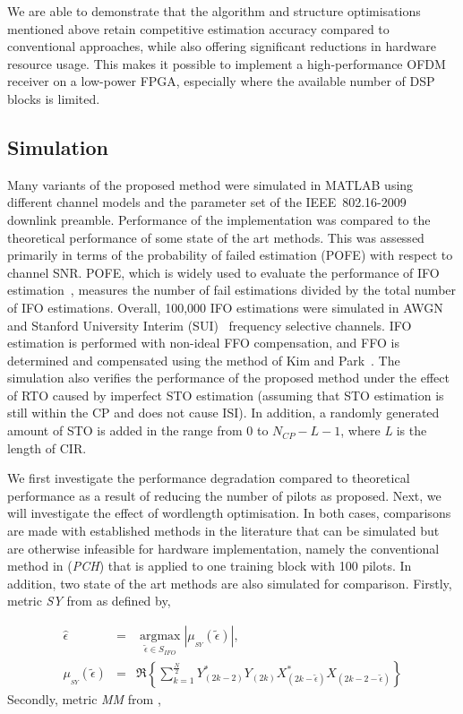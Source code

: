 We are able to demonstrate that the algorithm and structure optimisations mentioned above retain competitive estimation accuracy compared to conventional approaches, while also offering significant reductions in hardware resource usage.
This makes it possible to implement a high-performance OFDM receiver on a low-power FPGA, especially where the available number of DSP blocks is limited.

\subsection{Simulation}
\label{sec:Sim}
Many variants of the proposed method were simulated in MATLAB using different channel models and the parameter set of the IEEE~802.16-2009 downlink preamble. Performance of the implementation was compared to the theoretical performance of some state of the art methods.
This was assessed primarily in terms of the probability of failed estimation (POFE) with respect to channel SNR.
POFE, which is widely used to evaluate the performance of IFO estimation~\cite{Park2002,Shim2006,Morelli2008}, measures the number of fail estimations divided by the total number of IFO estimations.
Overall, 100,000 IFO estimations were simulated in AWGN and Stanford University Interim (SUI)~\cite{V.ErcegJuly2003} frequency selective channels.
IFO estimation is performed with non-ideal FFO compensation, and FFO is determined and compensated using the method of Kim and Park~\cite{Kim2008}.
The simulation also verifies the performance of the proposed method under the effect of RTO caused by imperfect STO estimation (assuming that STO estimation is still within the CP and does not cause ISI).
In addition, a randomly generated amount of STO is added in the range from 0 to $N_{CP}-L-1$, where \emph{L} is the length of CIR.

We first investigate the performance degradation compared to theoretical performance as a result of reducing the number of pilots as proposed. Next, we will investigate the effect of wordlength optimisation.
In both cases, comparisons are made with established methods in the literature that can be simulated but are otherwise infeasible for hardware implementation, namely the conventional method in \cite{Park2002} (\emph{PCH}) that is applied to one training block with 100 pilots.
In addition,  two state of the art methods are also simulated for comparison.
Firstly, metric \emph{SY} from \cite{Shim2006} as defined by,

\begin{eqnarray}
\label{equ:SY}
\hat{\epsilon} &=&\underset{\tilde{\epsilon} \in S_{IFO}}{\operatorname{argmax}} \left| \mu_{_{SY}}(\tilde{\epsilon})  \right|,	 \nonumber \\
\mu_{_{SY}}(\tilde{\epsilon}) &=& \Re{\left\{\sum_{k=1}^{\frac{N}{2}} Y^{*}_{(2k-2)} Y_{(2k)}  X^{*}_{(2k-\tilde{\epsilon})} X_{(2k-2-\tilde{\epsilon})}\right\}}
\end{eqnarray}
Secondly, metric \emph{MM} from \cite{Morelli2008},

